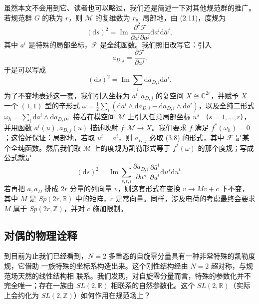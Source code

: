 \documentclass[11pt,a4paper,UTF8,fontset=fandol]{ctexart}
\theoremstyle{plain}
\theoremstyle{definition}
\newcommand{\R}{\mathbb{R}}
\newcommand{\C}{\mathbb{C}}
\newcommand{\Z}{\mathbb{Z}}
\newcommand{\dd}{\mathrm{d}}
\newcommand{\ii}{\mathrm{i}}
\renewcommand{\Im}{\operatorname{Im}}
\newcommand{\Nc}{\mathcal{N}}
\newcommand{\Ff}{\mathcal{F}}
\newcommand{\Mm}{\mathcal{M}}
\def\Nc{N}%
\begin{document}
虽然本文不会用到它、读者也可以略过，我们还是简述一下对其他规范群的推广。若规范群 $G$
的秩为 $r$，则 $\Mm$ 的复维数为 $r$。局部地，由 (2.11)，度规为
\begin{equation}
  (\dd s)^2=\Im\frac{\partial^2\Ff}{\partial a^i\partial a^j}\dd a^i\dd\bar a^j, \tag{3.7}
\end{equation}
其中 $a^i$ 是特殊的局部坐标，$\Ff$ 是全纯函数。我们照旧改写它：引入
\begin{equation}
  a_{D,j}=\frac{\partial\Ff}{\partial a^j}. \tag{3.8}
\end{equation}
于是可以写成
\begin{equation}
  (\dd s)^2=\Im\sum_i \dd a_{D,i}\dd\bar a^i. \tag{3.9}
\end{equation}
为了不变地表述这一套，我们引入坐标为 $a^i,a_{D,j}$ 的复空间 $X\cong\C^{2r}$，并赋予 $X$
一个 $(1,1)$ 型的辛形式
$\omega=\frac{\ii}{2}\sum_i\left(\dd a^i\wedge\dd\bar a_{D,i}
-\dd a_{D,i}\wedge\dd\bar a^i\right)$，以及全纯二形式
$\omega_h=\sum_i \dd a^i\wedge\dd a_{D,i}$。接着在模空间 $\Mm$ 上引入任意局部坐标 $u^s$
（$s=1,\dots,r$），并用函数 $a^i(u),a_{D,j}(u)$ 描述映射 $f:\Mm\to X$。我们要求 $f$
满足 $f^{\ast}(\omega_h)=0$；这恰好保证：局部地，若取 $u^i=a^i$，则 $a_{D,j}$ 必取
(3.8) 的形式，其中 $\Ff$ 是某个全纯函数。然后我们取 $\Mm$ 上的度规为凯勒形式等于
$f^{\ast}(\omega)$ 的那个度规；写成公式就是
\begin{equation}
  (\dd s)^2=\Im\sum_{s,t,i}
  \frac{\partial a_{D,i}}{\partial u^s}\frac{\partial\bar a^i}{\partial\bar u^t}
  \dd u^s\dd\bar u^t. \tag{3.10}
\end{equation}
若再把 $a,a_D$ 排成 $2r$ 分量的列向量 $v$，则这套形式在变换 $v\to Mv+c$ 下不变，其中
$M$ 是 $Sp(2r,\R)$ 中的矩阵，$c$ 是常向量。同样，涉及电荷的考虑最终会要求 $M$ 属于
$Sp(2r,\Z)$，并对 $c$ 施加限制。

\subsection{对偶的物理诠释}

到目前为止我们已经看到，$\Nc=2$ 多重态的自旋零分量具有一种非常特殊的凯勒度规，它借助
一族特殊的坐标系构造出来。这个刚性结构经由 $\Nc=2$ 超对称，与规范场天然的线性结构相
联系。我们发现，对自旋零分量而言，特殊的参数化并不完全唯一；存在一族由 $SL(2,\R)$
相联系的自然参数化。这个 $SL(2,\R)$（实际上会约化为 $SL(2,\Z)$）如何作用在规范场上？
\end{document}
